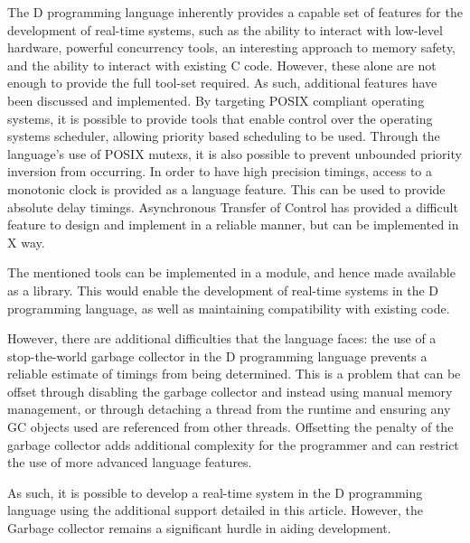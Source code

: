 
The D programming language inherently provides a capable set of features for the 
development of real-time systems, such as the ability to interact with low-level 
hardware, powerful concurrency tools, an interesting approach to memory 
safety, and the ability to interact with existing C code. 
However, these alone are not enough to provide the full tool-set required. As such, 
additional features have been discussed and implemented. 
By targeting POSIX compliant operating systems, it is possible 
to provide tools that enable control over the operating systems scheduler, 
allowing priority based scheduling to be used. 
Through the 
language's use of POSIX mutexs, it is also possible to prevent unbounded 
priority inversion from occurring.
In order to have high precision timings, access to a monotonic clock is provided 
as a language feature. This can be used to provide absolute delay timings. 
Asynchronous Transfer of Control has provided a difficult feature to design and 
implement in a reliable manner, but can be implemented in X way.
\par\bigskip\noindent
The mentioned tools can be implemented in a module, and hence made available as 
a library. 
This would enable the development of real-time systems in the D programming 
language, as well as maintaining compatibility with existing code. 
\par\bigskip\noindent
However, there are additional difficulties that the 
language faces: the use of a stop-the-world garbage collector in the 
D programming language prevents a reliable estimate of timings from being determined. 
This is a problem that can be offset through disabling the garbage collector 
and instead using manual memory management, or through detaching a thread from the 
runtime and ensuring any GC objects used are referenced from other threads.
Offsetting the penalty of the garbage collector adds additional complexity for 
the programmer and can restrict the use of more advanced language features. 
\par\bigskip\noindent
As such, it is possible to develop a real-time system in the D programming 
language using the additional support detailed in this article. However, 
the Garbage collector remains a significant hurdle in aiding development.
